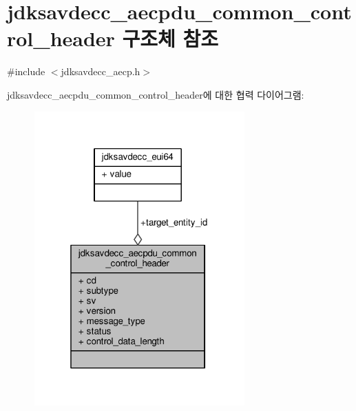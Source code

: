 \hypertarget{structjdksavdecc__aecpdu__common__control__header}{}\section{jdksavdecc\+\_\+aecpdu\+\_\+common\+\_\+control\+\_\+header 구조체 참조}
\label{structjdksavdecc__aecpdu__common__control__header}


{\ttfamily \#include $<$jdksavdecc\+\_\+aecp.\+h$>$}



jdksavdecc\+\_\+aecpdu\+\_\+common\+\_\+control\+\_\+header에 대한 협력 다이어그램\+:
\nopagebreak
\begin{figure}[H]
\begin{center}
\leavevmode
\includegraphics[width=229pt]{structjdksavdecc__aecpdu__common__control__header__coll__graph}
\end{center}
\end{figure}
